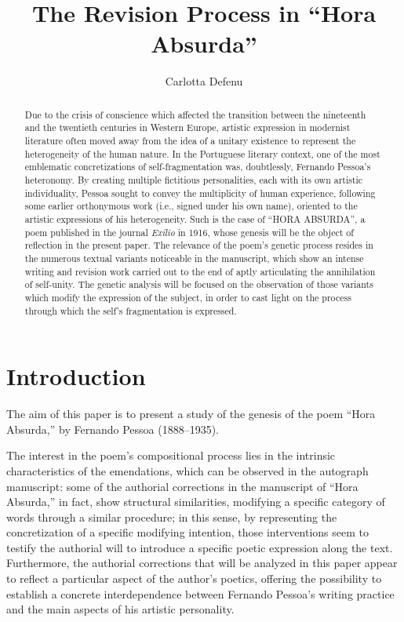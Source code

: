 \documentclass{article}
\author{Carlotta Defenu}
\title{The Revision Process in ``Hora Absurda''}
\begin{document}
\renewcommand*{\pagemark}{}

\begin{abstract}
Due to the crisis of conscience which affected the transition between the nineteenth and the twentieth centuries in Western Europe, artistic expression in modernist literature often moved away from the idea of a unitary existence to represent the heterogeneity of the human nature.
In the Portuguese literary context, one of the most emblematic concretizations of self-fragmentation was, doubtlessly, Fernando Pessoa’s heteronomy. 
By creating multiple fictitious personalities, each with its own artistic individuality, Pessoa sought to convey the multiplicity of human experience, following some earlier orthonymous work (i.e., signed under his own name), oriented to the artistic expressions of his heterogeneity. 
Such is the case of ``HORA ABSURDA'', a poem published in the journal \textit{Exílio} in 1916, whose genesis will be the object of reflection in the present paper. 
The relevance of the poem’s genetic process resides in the numerous textual variants noticeable in the manuscript, which show an intense writing and revision work carried out to the end of aptly articulating the annihilation of self-unity. The genetic analysis will be focused on the observation of those variants which modify the expression of the subject, in order to cast light on the process through which the self’s fragmentation is expressed. 
\end{abstract}

\section{Introduction} 
The aim of this paper is to present a study of the genesis of the poem
``Hora Absurda,'' by Fernando Pessoa (1888--1935).

The interest in the poem's compositional process lies in the intrinsic
characteristics of the emendations, which can be observed in the
autograph manuscript: some of the authorial corrections in the
manuscript of ``Hora Absurda,'' in fact, show structural similarities,
modifying a specific category of words through a similar procedure; in
this sense, by representing the concretization of a specific modifying
intention, those interventions seem to testify the authorial will to
introduce a specific poetic expression along the text. Furthermore, the
authorial corrections that will be analyzed in this paper appear to reflect a
particular aspect of the author's poetics, offering the possibility to
establish a concrete interdependence between Fernando Pessoa's writing
practice and the main aspects of his artistic personality.
\end{document}
